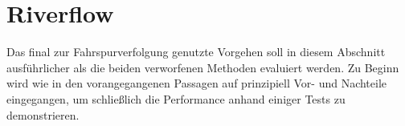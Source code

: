 \section{Riverflow \dcsecondauthorshort}
Das final zur Fahrspurverfolgung genutzte Vorgehen soll in diesem Abschnitt ausführlicher als die beiden verworfenen Methoden evaluiert werden. Zu Beginn wird wie in den vorangegangenen Passagen auf prinzipiell Vor- und Nachteile eingegangen, um schließlich die Performance anhand einiger Tests zu demonstrieren.


